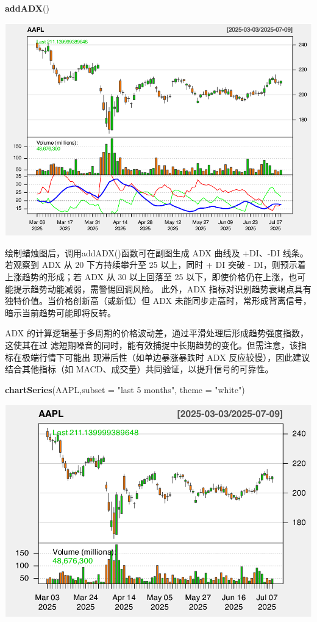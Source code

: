 \documentclass[]{ctexbook}
\newenvironment{Shaded}{\begin{snugshade}}{\end{snugshade}}
\newcommand{\AttributeTok}[1]{\textcolor[rgb]{0.13,0.29,0.53}{#1}}
\newcommand{\FunctionTok}[1]{\textcolor[rgb]{0.13,0.29,0.53}{\textbf{#1}}}
\newcommand{\NormalTok}[1]{#1}
\newcommand{\StringTok}[1]{\textcolor[rgb]{0.31,0.60,0.02}{#1}}
\begin{document}
\begin{Shaded}
\begin{Highlighting}[]
\FunctionTok{addADX}\NormalTok{()  }
\end{Highlighting}
\end{Shaded}

\includegraphics[width=0.9\linewidth]{quantmod_files/figure-latex/adx-2}

绘制蜡烛图后，调用addADX()函数可在副图生成 ADX 曲线及 +DI、-DI 线条。若观察到 ADX
从 20 下方持续攀升至 25 以上，同时 + DI 突破 - DI，则预示着上涨趋势的形成；若 ADX
从 30 以上回落至 25 以下，即使价格仍在上涨，也可能提示趋势动能减弱，需警惕回调风险。
此外，ADX 指标对识别趋势衰竭点具有独特价值。当价格创新高（或新低）但 ADX 未能同步走高时，常形成背离信号，暗示当前趋势可能即将反转。

ADX 的计算逻辑基于多周期的价格波动差，通过平滑处理后形成趋势强度指数，这使其在过
滤短期噪音的同时，能有效捕捉中长期趋势的变化。但需注意，该指标在极端行情下可能出
现滞后性（如单边暴涨暴跌时 ADX 反应较慢），因此建议结合其他指标（如 MACD、成交量）共同验证，以提升信号的可靠性。

\begin{Shaded}
\begin{Highlighting}[]
\FunctionTok{chartSeries}\NormalTok{(AAPL,}\AttributeTok{subset =} \StringTok{"last 5 months"}\NormalTok{, }\AttributeTok{theme =} \StringTok{"white"}\NormalTok{)}
\end{Highlighting}
\end{Shaded}

\includegraphics[width=0.9\linewidth]{quantmod_files/figure-latex/adx_2-1}
\end{document}
